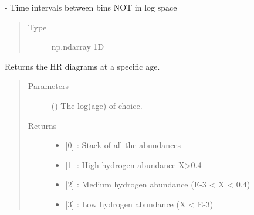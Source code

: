 \documentclass[letterpaper,10pt,english]{sphinxmanual}
\begin{document}
\begin{fulllineitems}
\begin{fulllineitems}
\begin{quote}
\begin{description}
\end{description}\end{quote}

\end{fulllineitems}


\begin{fulllineitems}
\label{\detokenize{hrdiagrams:hoki.hrdiagrams.HRDiagram.self.dt}}
 - Time intervals between bins NOT in log space
\begin{quote}\begin{description}
\item[{Type}] \leavevmode
np.ndarray 1D

\end{description}\end{quote}

\end{fulllineitems}


\begin{fulllineitems}
\label{\detokenize{hrdiagrams:hoki.hrdiagrams.HRDiagram.at_log_age}}
Returns the HR diagrams at a specific age.
\begin{quote}\begin{description}
\item[{Parameters}] \leavevmode
{} () \textendash{} The log(age) of choice.

\item[{Returns}] \leavevmode
\begin{itemize}
\item {} 
{[}0{]} : Stack of all the abundances

\item {} 
{[}1{]} : High hydrogen abundance X\textgreater{}0.4

\item {} 
{[}2{]} : Medium hydrogen abundance (E-3 \textless{} X \textless{} 0.4)

\item {} 
{[}3{]} : Low hydrogen abundance (X \textless{} E-3)


\end{itemize}
\end{description}
\end{quote}
\end{fulllineitems}
\end{fulllineitems}
\end{document}
